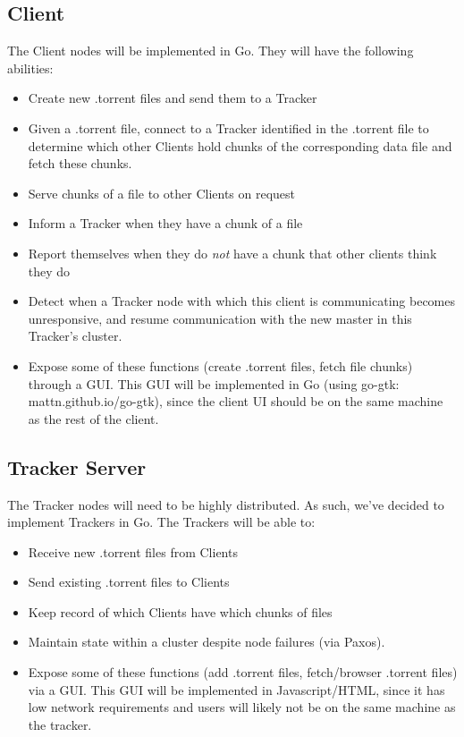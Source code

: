 \documentclass[12pt]{article}
\begin{document}
\subsection*{Client}
The Client nodes will be implemented in Go.
They will have the following abilities:
\begin{itemize}
\item  Create new .torrent files and send them to a Tracker
\item  Given a .torrent file, connect to a Tracker identified in the
       .torrent file to determine which other Clients hold chunks of the
       corresponding data file and fetch these chunks.
\item  Serve chunks of a file to other Clients on request
\item  Inform a Tracker when they have a chunk of a file
\item  Report themselves when they do \emph{not} have a chunk that other clients
       think they do
\item  Detect when a Tracker node with which this client is communicating
       becomes unresponsive, and resume communication with the new master in
       this Tracker's cluster.
\item  Expose some of these functions (create .torrent files, fetch file chunks)
       through a GUI. This GUI will be implemented in Go (using go-gtk:
       mattn.github.io/go-gtk), since the client UI should be on the same
       machine as the rest of the client.
\end{itemize}

\subsection*{Tracker Server}
The Tracker nodes will need to be highly distributed.
As such, we've decided to implement Trackers in Go.
The Trackers will be able to:
\begin{itemize}
\item  Receive new .torrent files from Clients
\item  Send existing .torrent files to Clients
\item  Keep record of which Clients have which chunks of files
\item  Maintain state within a cluster despite node failures (via Paxos).
\item  Expose some of these functions (add .torrent files, fetch/browser
       .torrent files) via a GUI. This GUI will be implemented in
       Javascript/HTML, since it has low network requirements and users
       will likely not be on the same machine as the tracker.
\end{itemize}
\end{document}
